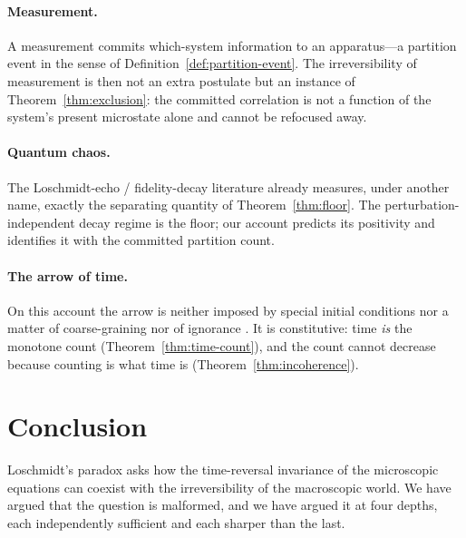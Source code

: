 \documentclass[11pt,a4paper]{article}
\theoremstyle{thmstyle}
\theoremstyle{definition}
\theoremstyle{remark}
\begin{document}
\paragraph{Measurement.} A measurement commits which-system information
to an apparatus---a partition event in the sense of
Definition~\ref{def:partition-event}. The irreversibility of measurement
is then not an extra postulate but an instance of
Theorem~\ref{thm:exclusion}: the committed correlation is not a function
of the system's present microstate alone and cannot be refocused away.

\paragraph{Quantum chaos.} The Loschmidt-echo / fidelity-decay literature
\citep{jalabert2001,gorin2006} already measures, under another name,
exactly the separating quantity of Theorem~\ref{thm:floor}. The
perturbation-independent decay regime is the floor; our account predicts
its positivity and identifies it with the committed partition count.

\paragraph{The arrow of time.} On this account the arrow is neither
imposed by special initial conditions \citep{penrose1989} nor a matter of
coarse-graining \citep{gibbs1902} nor of ignorance \citep{jaynes1957}. It
is constitutive: time \emph{is} the monotone count
(Theorem~\ref{thm:time-count}), and the count cannot decrease because
counting is what time is (Theorem~\ref{thm:incoherence}).

\section{Conclusion}
\label{sec:conclusion}

Loschmidt's paradox asks how the time-reversal invariance of the
microscopic equations can coexist with the irreversibility of the
macroscopic world. We have argued that the question is malformed, and we
have argued it at four depths, each independently sufficient and each
sharper than the last.
\end{document}
